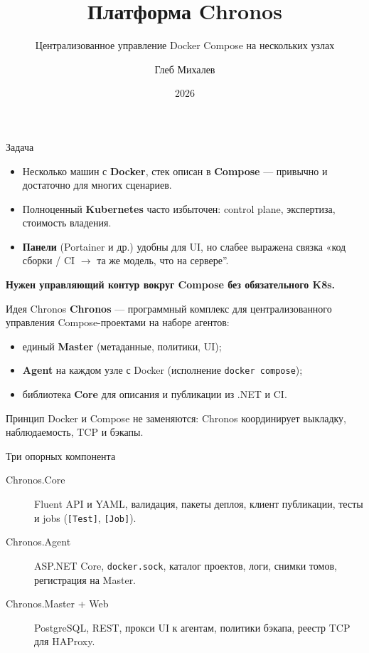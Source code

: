 \documentclass[aspectratio=169,12pt]{beamer}
\title{Платформа Chronos}
\subtitle{Централизованное управление Docker Compose на нескольких узлах}
\author{Глеб Михалев}
\institute{Выпускная квалификационная работа}
\date{2026}
\begin{document}
\begin{frame}
  \titlepage
\end{frame}

\begin{frame}{Задача}
  \begin{itemize}
    \item Несколько машин с \textbf{Docker}, стек описан в \textbf{Compose} — привычно и достаточно для многих сценариев.
    \item Полноценный \textbf{Kubernetes} часто избыточен: control plane, экспертиза, стоимость владения.
    \item \textbf{Панели} (Portainer и др.) удобны для UI, но слабее выражена связка «код сборки / CI $\rightarrow$ та же модель, что на сервере''.
  \end{itemize}
  \vfill
  \centering
  \textbf{Нужен управляющий контур вокруг Compose без обязательного K8s.}
\end{frame}

\begin{frame}{Идея Chronos}
  \textbf{Chronos} — программный комплекс для централизованного управления Compose-проектами на наборе агентов:
  \begin{itemize}
    \item единый \textbf{Master} (метаданные, политики, UI);
    \item \textbf{Agent} на каждом узле с Docker (исполнение \texttt{docker compose});
    \item библиотека \textbf{Core} для описания и публикации из .NET и CI.
  \end{itemize}
  \vfill
  \begin{block}{Принцип}
    Docker и Compose не заменяются: Chronos координирует выкладку, наблюдаемость, TCP и бэкапы.
  \end{block}
\end{frame}

\begin{frame}{Три опорных компонента}
  \begin{description}
    \item[Chronos.Core] Fluent API и YAML, валидация, пакеты деплоя, клиент публикации, тесты и jobs (\texttt{[Test]}, \texttt{[Job]}).
    \item[Chronos.Agent] ASP.NET Core, \texttt{docker.sock}, каталог проектов, логи, снимки томов, регистрация на Master.
    \item[Chronos.Master + Web] PostgreSQL, REST, прокси UI к агентам, политики бэкапа, реестр TCP для HAProxy.
  \end{description}
\end{frame}
\end{document}
